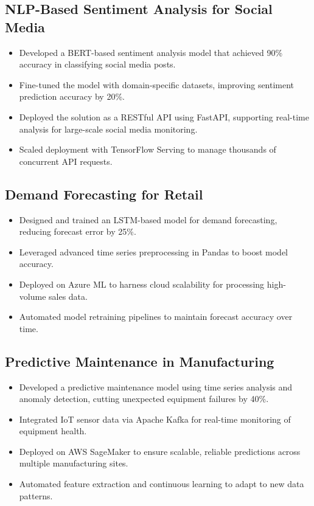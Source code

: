 \documentclass[12pt,a4paper]{article}
\begin{document}
\subsection*{NLP-Based Sentiment Analysis for Social Media}
\begin{itemize}[leftmargin=*,noitemsep,topsep=0pt]
  \item Developed a BERT-based sentiment analysis model that achieved 90\% accuracy in classifying social media posts.
  \item Fine-tuned the model with domain-specific datasets, improving sentiment prediction accuracy by 20\%.
  \item Deployed the solution as a RESTful API using FastAPI, supporting real-time analysis for large-scale social media monitoring.
  \item Scaled deployment with TensorFlow Serving to manage thousands of concurrent API requests.
\end{itemize}

\subsection*{Demand Forecasting for Retail}
\begin{itemize}[leftmargin=*,noitemsep,topsep=0pt]
  \item Designed and trained an LSTM-based model for demand forecasting, reducing forecast error by 25\%.
  \item Leveraged advanced time series preprocessing in Pandas to boost model accuracy.
  \item Deployed on Azure ML to harness cloud scalability for processing high-volume sales data.
  \item Automated model retraining pipelines to maintain forecast accuracy over time.
\end{itemize}

\subsection*{Predictive Maintenance in Manufacturing}
\begin{itemize}[leftmargin=*,noitemsep,topsep=0pt]
  \item Developed a predictive maintenance model using time series analysis and anomaly detection, cutting unexpected equipment failures by 40\%.
  \item Integrated IoT sensor data via Apache Kafka for real-time monitoring of equipment health.
  \item Deployed on AWS SageMaker to ensure scalable, reliable predictions across multiple manufacturing sites.
  \item Automated feature extraction and continuous learning to adapt to new data patterns.
\end{itemize}
\end{document}
